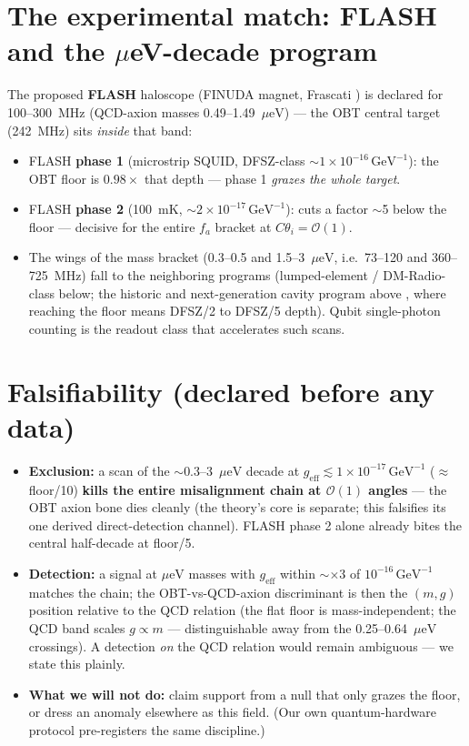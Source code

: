 \documentclass[11pt]{article}
\newcommand{\geff}{g_{\mathrm{eff}}}
\newcommand{\ueV}{\mu\mathrm{eV}}
\newcommand{\GeV}{\mathrm{GeV}}
\begin{document}
\section{The experimental match: FLASH and the $\mu$eV-decade program}
The proposed \textbf{FLASH} haloscope (FINUDA magnet, Frascati \cite{FLASH2023}) is declared for
100--300~MHz (QCD-axion masses 0.49--1.49~$\ueV$) --- the OBT central target (242~MHz) sits
\emph{inside} that band:
\begin{itemize}
\item FLASH \textbf{phase 1} (microstrip SQUID, DFSZ-class $\sim\!1\times10^{-16}\,\GeV^{-1}$): the
OBT floor is $0.98\times$ that depth --- phase 1 \emph{grazes the whole target}.
\item FLASH \textbf{phase 2} (100~mK, $\sim\!2\times10^{-17}\,\GeV^{-1}$): cuts a factor $\sim$5
below the floor --- decisive for the entire $f_a$ bracket at $C\theta_i = \mathcal{O}(1)$.
\item The wings of the mass bracket (0.3--0.5 and 1.5--3~$\ueV$, i.e.\ 73--120 and 360--725~MHz)
fall to the neighboring programs (lumped-element / DM-Radio-class below; the historic and
next-generation cavity program above \cite{ADMX2018,ADMX2021}, where reaching the floor means
DFSZ/2 to DFSZ/5 depth). Qubit single-photon counting \cite{Dixit2021} is the readout class that
accelerates such scans.
\end{itemize}

\section{Falsifiability (declared before any data)}
\begin{itemize}
\item \textbf{Exclusion:} a scan of the $\sim$0.3--3~$\ueV$ decade at
$\geff \lesssim 1\times10^{-17}\,\GeV^{-1}$ ($\approx$ floor/10) \textbf{kills the entire
misalignment chain at $\mathcal{O}(1)$ angles} --- the OBT axion bone dies cleanly (the theory's
core is separate; this falsifies its one derived direct-detection channel). FLASH phase 2 alone
already bites the central half-decade at floor/5.
\item \textbf{Detection:} a signal at $\ueV$ masses with $\geff$ within $\sim$$\times$3 of
$10^{-16}\,\GeV^{-1}$ matches the chain; the OBT-vs-QCD-axion discriminant is then the $(m, g)$
position relative to the QCD relation (the flat floor is mass-independent; the QCD band scales
$g \propto m$ --- distinguishable away from the 0.25--0.64~$\ueV$ crossings). A detection \emph{on}
the QCD relation would remain ambiguous --- we state this plainly.
\item \textbf{What we will not do:} claim support from a null that only grazes the floor, or dress an
anomaly elsewhere as this field. (Our own quantum-hardware protocol pre-registers the same
discipline.)
\end{itemize}
\end{document}
